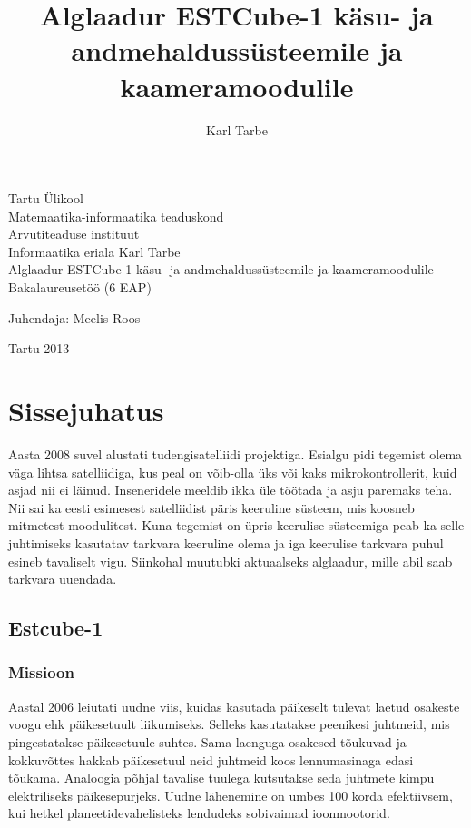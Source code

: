 \documentclass[12pt,a4paper]{article}
\title{Alglaadur ESTCube-1 käsu- ja andmehaldussüsteemile ja kaameramoodulile}
\author{Karl Tarbe}
\begin{document}
\begin{titlepage}
\begin{center}
Tartu Ülikool\\
Matemaatika-informaatika teaduskond\\
Arvutiteaduse instituut\\
Informaatika eriala
\vfill
Karl Tarbe\\[1cm]
Alglaadur ESTCube-1 käsu- ja andmehaldussüsteemile ja kaameramoodulile\\[4mm]
Bakalaureusetöö (6 EAP)
\vspace{2cm}
\begin{flushright}
	Juhendaja: Meelis Roos
\end{flushright}
\vfill
Tartu 2013
\end{center}
\end{titlepage}
\setcounter{page}{2}
\tableofcontents

\section{Sissejuhatus}
Aasta 2008 suvel alustati tudengisatelliidi projektiga. Esialgu pidi tegemist
olema väga lihtsa satelliidiga, kus peal on võib-olla üks või kaks
mikrokontrollerit, kuid asjad nii ei läinud. Inseneridele meeldib ikka üle
töötada ja asju paremaks teha. Nii sai ka eesti esimesest satelliidist päris
keeruline süsteem, mis koosneb mitmetest moodulitest. Kuna tegemist on üpris
keerulise süsteemiga peab ka selle juhtimiseks kasutatav tarkvara keeruline
olema ja iga keerulise tarkvara puhul esineb tavaliselt vigu. Siinkohal muutubki
aktuaalseks alglaadur, mille abil saab tarkvara uuendada.

\subsection{Estcube-1}
\subsubsection{Missioon}
Aastal 2006 leiutati uudne viis, kuidas kasutada päikeselt tulevat laetud
osakeste voogu ehk päikesetuult liikumiseks. Selleks kasutatakse peenikesi
juhtmeid, mis pingestatakse päikesetuule suhtes. Sama laenguga osakesed tõukuvad
ja kokkuvõttes hakkab päikesetuul neid juhtmeid koos lennumasinaga edasi
tõukama. Analoogia põhjal tavalise tuulega kutsutakse seda juhtmete kimpu
elektriliseks päikesepurjeks. Uudne lähenemine on umbes 100 korda efektiivsem,
kui hetkel planeetidevahelisteks lendudeks sobivaimad ioonmootorid.
\cite{errpuri}
\end{document}
